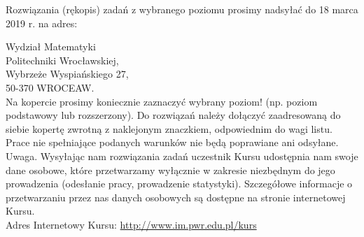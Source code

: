 \documentclass[10pt]{article}
\begin{document}
Rozwiązania (rękopis) zadań z wybranego poziomu prosimy nadsyłać do 18 marca 2019 r. na adres:

Wydział Matematyki\\
Politechniki Wrocławskiej,\\
Wybrzeże Wyspiańskiego 27,\\
50-370 WROCEAW.\\
Na kopercie prosimy koniecznie zaznaczyć wybrany poziom! (np. poziom podstawowy lub rozszerzony). Do rozwiązań należy dołączyć zaadresowaną do siebie kopertę zwrotną z naklejonym znaczkiem, odpowiednim do wagi listu. Prace nie spełniające podanych warunków nie będą poprawiane ani odsyłane.\\
Uwaga. Wysyłając nam rozwiązania zadań uczestnik Kursu udostępnia nam swoje dane osobowe, które przetwarzamy wyłącznie w zakresie niezbędnym do jego prowadzenia (odesłanie pracy, prowadzenie statystyki). Szczegółowe informacje o przetwarzaniu przez nas danych osobowych są dostępne na stronie internetowej Kursu.\\
Adres Internetowy Kursu: \href{http://www.im.pwr.edu.pl/kurs}{http://www.im.pwr.edu.pl/kurs}
\end{document}
